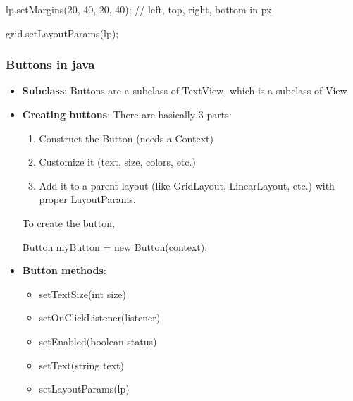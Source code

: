 \documentclass{report}
\begin{document}
\begin{itemize}
\begin{javacode}
                lp.setMargins(20, 40, 20, 40); // left, top, right, bottom in px

                grid.setLayoutParams(lp);
            \end{javacode}

    \end{itemize}

    \pagebreak 
    \subsubsection{Buttons in java}
    \begin{itemize}
        \item \textbf{Subclass}: Buttons are a subclass of TextView, which is a subclass of View 
        \item \textbf{Creating buttons}: There are basically 3 parts:
            \begin{enumerate}
                \item Construct the Button (needs a Context)
                \item Customize it (text, size, colors, etc.)
                \item Add it to a parent layout (like GridLayout, LinearLayout, etc.) with proper LayoutParams.
            \end{enumerate}
            To create the button,
            \bigbreak \noindent 
            \begin{javacode}
            Button myButton = new Button(context);
            \end{javacode}
        \item \textbf{Button methods}:
            \begin{itemize}
                \item setTextSize(int size)
                \item setOnClickListener(listener)
                \item setEnabled(boolean status)
                \item setText(string text)
                \item setLayoutParams(lp)
            \end{itemize}
    \end{itemize}

    \pagebreak 
\end{document}
